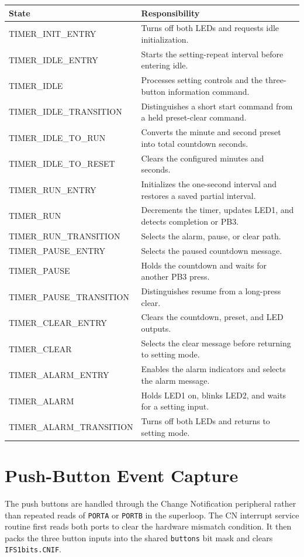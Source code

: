 \documentclass[11pt]{article}
\newcommand{\code}[1]{\texttt{#1}}
\begin{document}
\begin{longtable}{>{\ttfamily}p{}p{}}
\hline
\normalfont State & Responsibility \\
\hline
\endhead
TIMER\_INIT\_ENTRY & Turns off both LEDs and requests idle initialization. \\
TIMER\_IDLE\_ENTRY & Starts the setting-repeat interval before entering idle. \\
TIMER\_IDLE & Processes setting controls and the three-button information command. \\
TIMER\_IDLE\_TRANSITION & Distinguishes a short start command from a held preset-clear command. \\
TIMER\_IDLE\_TO\_RUN & Converts the minute and second preset into total countdown seconds. \\
TIMER\_IDLE\_TO\_RESET & Clears the configured minutes and seconds. \\
TIMER\_RUN\_ENTRY & Initializes the one-second interval and restores a saved partial interval. \\
TIMER\_RUN & Decrements the timer, updates LED1, and detects completion or PB3. \\
TIMER\_RUN\_TRANSITION & Selects the alarm, pause, or clear path. \\
TIMER\_PAUSE\_ENTRY & Selects the paused countdown message. \\
TIMER\_PAUSE & Holds the countdown and waits for another PB3 press. \\
TIMER\_PAUSE\_TRANSITION & Distinguishes resume from a long-press clear. \\
TIMER\_CLEAR\_ENTRY & Clears the countdown, preset, and LED outputs. \\
TIMER\_CLEAR & Selects the clear message before returning to setting mode. \\
TIMER\_ALARM\_ENTRY & Enables the alarm indicators and selects the alarm message. \\
TIMER\_ALARM & Holds LED1 on, blinks LED2, and waits for a setting input. \\
TIMER\_ALARM\_TRANSITION & Turns off both LEDs and returns to setting mode. \\
\hline
\end{longtable}

\section{Push-Button Event Capture}

The push buttons are handled through the Change Notification peripheral rather than repeated reads of \code{PORTA} or \code{PORTB} in the superloop. The CN interrupt service routine first reads both ports to clear the hardware mismatch condition. It then packs the three button inputs into the shared \code{buttons} bit mask and clears \code{IFS1bits.CNIF}.
\end{document}
